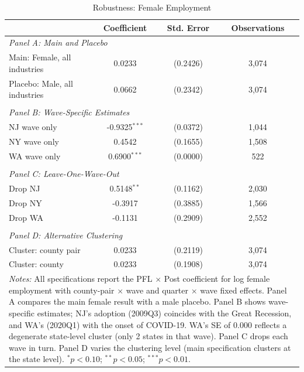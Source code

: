 \begin{table}[htbp]
\centering
\caption{Robustness: Female Employment}
\label{tab:robustness}
\begin{tabular}{lccc}
\hline\hline
 & Coefficient & Std. Error & Observations \\
\hline
\multicolumn{4}{l}{\textit{Panel A: Main and Placebo}} \\
Main: Female, all industries & 0.0233 & (0.2426) & 3,074 \\
Placebo: Male, all industries & 0.0662 & (0.2342) & 3,074 \\
\\
\multicolumn{4}{l}{\textit{Panel B: Wave-Specific Estimates}} \\
NJ wave only & -0.9325$^{***}$ & (0.0372) & 1,044 \\
NY wave only & 0.4542 & (0.1655) & 1,508 \\
WA wave only & 0.6900$^{***}$ & (0.0000) & 522 \\
\\
\multicolumn{4}{l}{\textit{Panel C: Leave-One-Wave-Out}} \\
Drop NJ & 0.5148$^{**}$ & (0.1162) & 2,030 \\
Drop NY & -0.3917 & (0.3885) & 1,566 \\
Drop WA & -0.1131 & (0.2909) & 2,552 \\
\\
\multicolumn{4}{l}{\textit{Panel D: Alternative Clustering}} \\
Cluster: county pair & 0.0233 & (0.2119) & 3,074 \\
Cluster: county & 0.0233 & (0.1908) & 3,074 \\
\hline\hline
\multicolumn{4}{p{0.85\textwidth}}{\footnotesize \textit{Notes:} All specifications report the PFL $\times$ Post coefficient for log female employment with county-pair $\times$ wave and quarter $\times$ wave fixed effects. Panel A compares the main female result with a male placebo. Panel B shows wave-specific estimates; NJ's adoption (2009Q3) coincides with the Great Recession, and WA's (2020Q1) with the onset of COVID-19. WA's SE of 0.000 reflects a degenerate state-level cluster (only 2 states in that wave). Panel C drops each wave in turn. Panel D varies the clustering level (main specification clusters at the state level). $^{*}p<0.10$; $^{**}p<0.05$; $^{***}p<0.01$.} \\
\end{tabular}
\end{table}
